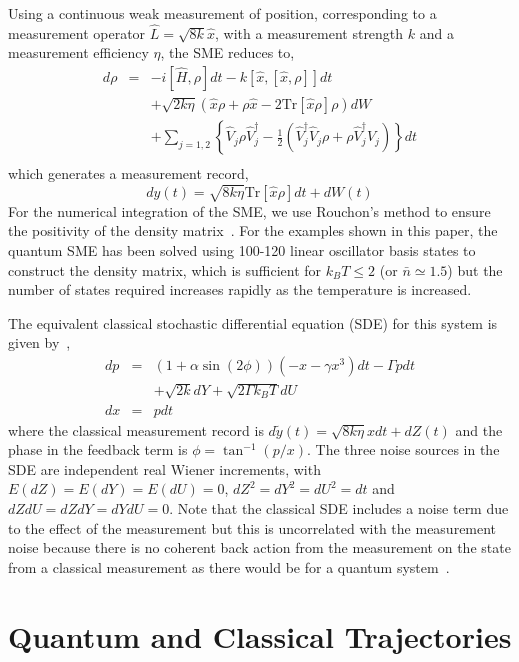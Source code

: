 \documentclass[conference]{IEEEtran}
\begin{document}
Using a continuous weak measurement of position, corresponding to a measurement operator $\hat{L}= \sqrt{8k}\hat{x}$, with a measurement strength $k$ and a measurement efficiency $\eta$, the SME reduces to,
\begin{eqnarray}\label{sme2}
 d\rho & = & -i [\hat{H}, \rho] dt - k [\hat{x},[\hat{x},\rho]] dt  \nonumber \\ 
                 &&+ \sqrt{2k\eta}(\hat{x} \rho + \rho \hat{x} - 2 \mbox{Tr}[\hat{x}\rho] \rho ) dW \nonumber \\ 
                 && + \sum_{j= 1,2} \left\{\hat{V}_{j} \rho \hat{V}^{\dagger}_{j} -\frac{1}{2}\left(\hat{V}^{\dagger}_{j} \hat{V}_{j} \rho + \rho\hat{V}^{\dagger}_{j} V_{j} \right)\right\}dt \nonumber \\ 
\end{eqnarray} 
which generates a measurement record,
$$
dy(t) = \sqrt{8k\eta} \mathrm{Tr}[\hat{x}\rho] dt + dW(t)
$$
For the numerical integration of the SME, we use Rouchon's method  to ensure the positivity of the density matrix~\cite{Ami2011,Rou2015}. For the examples shown in this paper, the quantum SME has been solved using 100-120 linear oscillator basis states to construct the density matrix, which is sufficient for $k_B T\le 2$ (or $\bar{n}\simeq 1.5$) but the number of states required increases rapidly as the temperature is increased. 

The equivalent classical stochastic differential equation (SDE) for this system is given by~\cite{Hop2003},
\begin{eqnarray}\label{sde1}
dp &= &(1+\alpha\sin(2\phi))(-x - \gamma x^3)dt-\Gamma p dt \nonumber \\
       &&+ \sqrt{2k}dY+\sqrt{2 \Gamma k_B T}dU \nonumber \\ 
dx  &=& p dt 
\end{eqnarray}
where the classical measurement record is $d\tilde{y}(t) = \sqrt{8k\eta} x dt+dZ(t)$ and the phase in the feedback term is $\phi = \tan^{-1}(p/x)$. The three noise sources in the SDE are independent real Wiener increments,  with $E(dZ)=E(dY)=E(dU)=0$, $dZ^2=dY^2=dU^2=dt$ and $dZdU=dZdY=dYdU=0$. Note that the classical SDE includes a noise term due to the effect of the measurement but this is uncorrelated with the measurement noise because there is no coherent back action from the measurement on the state from a classical measurement as there would be for a quantum system~\cite{Hop2003}.

\section{Quantum and Classical Trajectories}\label{results}
\end{document}
